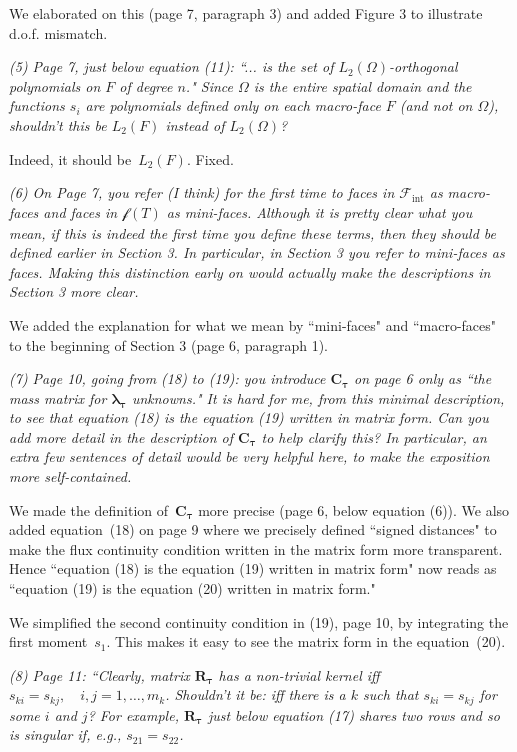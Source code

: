 \documentclass[12pt]{article}
\newcommand{\vect}[1]{\boldsymbol{\mathbf{#1}}}
\newcommand{\mfaces}[1][]{{\vect{\mathcal f}_{\text{#1}}}}
\newcommand{\bfaces}[1][]{{\vect{\mathcal F}_{\text{#1}}}}
\begin{document}
We elaborated on this (page 7, paragraph 3) and added Figure 3 to illustrate d.o.f. mismatch.

\emph{(5) Page 7, just below equation (11): ``... is the set of $L_{2}\left(\Omega\right)$-orthogonal polynomials on $F$ of degree $n$." Since $\Omega$ is the entire spatial domain and the functions $s_{i}$ are polynomials defined only on each macro-face $F$ (and not on $\Omega$), shouldn't this be $L_{2}\left(F\right)$ instead of $L_{2}\left(\Omega\right)$?}

Indeed, it should be~$L_{2}\left(F\right)$. Fixed.

\emph{(6) On Page 7, you refer (I think) for the first time to faces in $\bfaces[int]$ as macro-faces and faces in $\mfaces(T)$ as mini-faces. Although it is pretty clear what you mean, if this is indeed the first time you define these terms, then they should be defined earlier in Section 3. In particular, in Section 3 you refer to mini-faces as faces. Making this distinction early on would actually make the descriptions in Section 3 more clear.}

We added the explanation for what we mean by ``mini-faces" and ``macro-faces" to the beginning of Section 3 (page 6, paragraph 1).

\emph{(7) Page 10, going from (18) to (19): you introduce $\mathbf{C}_{\boldsymbol{\tau}}$ on page 6 only as ``the mass matrix for $\vect \lambda_{\boldsymbol{\tau}}$ unknowns." It is hard for me, from this minimal description, to see that equation (18) is the equation (19) written in matrix form. Can you add more detail in the description of $\mathbf{C}_{\boldsymbol{\tau}}$ to help clarify this? In particular, an extra few sentences of detail would be very helpful here, to make the exposition more self-contained.}

We made the definition of~$\vect C_{\boldsymbol{\tau}}$ more precise (page 6, below equation (6)). We also added equation~(18) on page 9 where we precisely defined ``signed distances" to make the flux continuity condition written in the matrix form more transparent. Hence ``equation (18) is the equation (19) written in matrix form" now reads as ``equation (19) is the equation (20) written in matrix form."

We simplified the second continuity condition in (19), page 10, by integrating the first moment~$s_1$. This makes it easy to see the matrix form in the equation~(20).

\emph{(8) Page 11: ``Clearly, matrix $\mathbf{R}_{\boldsymbol{\tau}}$ has a non-trivial kernel iff $s_{ki}=s_{kj}, \quad i,j=1,\ldots,m_{k}$. Shouldn't it be: iff there is a $k$ such that $s_{ki}=s_{kj}$ for some $i$ and $j$? For example, $\mathbf{R}_{\boldsymbol{\tau}}$ just below equation (17) shares two rows and so is singular if, e.g., $s_{21}=s_{22}$.}
\end{document}
